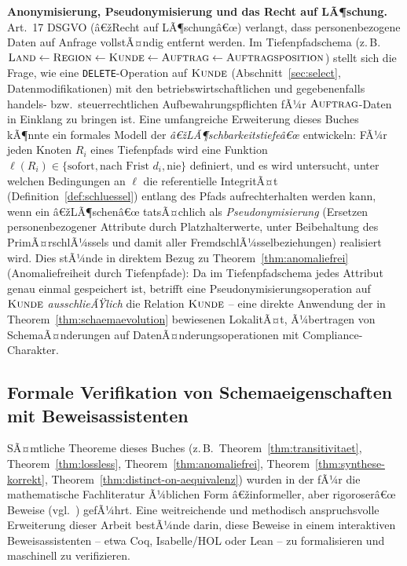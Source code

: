 ﻿\documentclass[a4paper,12pt]{report}
\theoremstyle{definition}
\theoremstyle{remark}
\begin{document}
\textbf{Anonymisierung, Pseudonymisierung und das Recht auf
LÃ¶schung.} Art.~17 DSGVO (â€žRecht auf LÃ¶schungâ€œ) verlangt, dass
personenbezogene Daten auf Anfrage vollstÃ¤ndig entfernt werden. Im
Tiefenpfadschema (z.\,B.\ $\textsc{Land}\leftarrow\textsc{Region}
\leftarrow\textsc{Kunde}\leftarrow\textsc{Auftrag}\leftarrow
\textsc{Auftragsposition}$) stellt sich die Frage, wie eine
\texttt{DELETE}-Operation auf $\textsc{Kunde}$
(Abschnitt~\ref{sec:select}, Datenmodifikationen) mit den
betriebswirtschaftlichen und gegebenenfalls handels- bzw.\
steuerrechtlichen Aufbewahrungspflichten fÃ¼r
$\textsc{Auftrag}$-Daten in Einklang zu bringen ist. Eine umfangreiche
Erweiterung dieses Buches kÃ¶nnte ein formales Modell der
\emph{â€žLÃ¶schbarkeitstiefeâ€œ} entwickeln: FÃ¼r jeden Knoten $R_i$ eines
Tiefenpfads wird eine Funktion $\ell(R_i)\in\{\text{sofort},
\text{nach Frist }d_i,\text{nie}\}$ definiert, und es wird untersucht,
unter welchen Bedingungen an $\ell$ die referentielle IntegritÃ¤t
(Definition~\ref{def:schluessel}) entlang des Pfads aufrechterhalten
werden kann, wenn ein â€žLÃ¶schenâ€œ tatsÃ¤chlich als
\emph{Pseudonymisierung} (Ersetzen personenbezogener Attribute durch
Platzhalterwerte, unter Beibehaltung des PrimÃ¤rschlÃ¼ssels und damit
aller FremdschlÃ¼sselbeziehungen) realisiert wird. Dies stÃ¼nde in
direktem Bezug zu Theorem~\ref{thm:anomaliefrei}
(Anomaliefreiheit durch Tiefenpfade): Da im Tiefenpfadschema jedes
Attribut genau einmal gespeichert ist, betrifft eine
Pseudonymisierungsoperation auf $\textsc{Kunde}$ \emph{ausschlieÃŸlich}
die Relation $\textsc{Kunde}$ -- eine direkte Anwendung der in
Theorem~\ref{thm:schaemaevolution} bewiesenen LokalitÃ¤t, Ã¼bertragen
von SchemaÃ¤nderungen auf DatenÃ¤nderungsoperationen mit
Compliance-Charakter.

\subsection{Formale Verifikation von Schemaeigenschaften mit Beweisassistenten}
\label{sec:ausblick-verifikation}

SÃ¤mtliche Theoreme dieses Buches (z.\,B.\
Theorem~\ref{thm:transitivitaet},
Theorem~\ref{thm:lossless},
Theorem~\ref{thm:anomaliefrei},
Theorem~\ref{thm:synthese-korrekt},
Theorem~\ref{thm:distinct-on-aequivalenz}) wurden in der fÃ¼r die
mathematische Fachliteratur Ã¼blichen Form â€žinformeller, aber
rigoroserâ€œ Beweise (vgl.\ \cite{Cormen2009}) gefÃ¼hrt. Eine
weitreichende und methodisch anspruchsvolle Erweiterung dieser Arbeit
bestÃ¼nde darin, diese Beweise in einem interaktiven
Beweisassistenten -- etwa Coq, Isabelle/HOL oder Lean -- zu
formalisieren und maschinell zu verifizieren.
\end{document}
